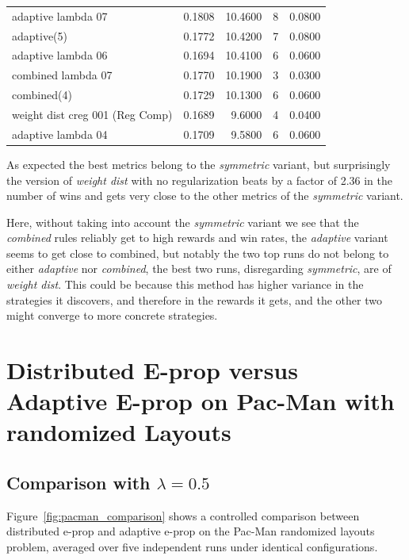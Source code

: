 \begin{table}[H]
\begin{tabular}{l r r r r}
adaptive lambda 07                     & 0.1808 & 10.4600 & 8  & 0.0800 \\
adaptive(5)                            & 0.1772 & 10.4200 & 7  & 0.0800 \\
adaptive lambda 06                     & 0.1694 & 10.4100 & 6  & 0.0600 \\
combined lambda 07                     & 0.1770 & 10.1900 & 3  & 0.0300 \\
combined(4)                            & 0.1729 & 10.1300 & 6  & 0.0600 \\
weight dist creg 001 (Reg Comp)        & 0.1689 & 9.6000  & 4  & 0.0400 \\
adaptive lambda 04                     & 0.1709 & 9.5800  & 6  & 0.0600 \\
\hline
\end{tabular}
\end{table}

As expected the best metrics belong to the \emph{symmetric} variant, but surprisingly the version of \emph{weight dist} with no regularization beats by a factor of 2.36 in the number of wins and gets very close to the other metrics of the \emph{symmetric} variant.

Here, without taking into account the \emph{symmetric} variant we see that the \emph{combined} rules reliably get to high rewards and win rates, the \emph{adaptive} variant seems to get close to combined, but notably the two top runs do not belong to either \emph{adaptive} nor \emph{combined}, the best two runs, disregarding \emph{symmetric}, are of \emph{weight dist}. This could be because this method has higher variance in the strategies it discovers, and therefore in the rewards it gets, and the other two might converge to more concrete strategies.

\clearpage

\section{Distributed E-prop versus Adaptive E-prop on Pac-Man with
randomized Layouts}
\label{sec:pacman_comparison}

\subsection{Comparison with $\lambda = 0.5$}
Figure~\ref{fig:pacman_comparison} shows a controlled comparison between
distributed e-prop and adaptive e-prop on the Pac-Man randomized layouts
problem, averaged over five independent runs under identical configurations.

